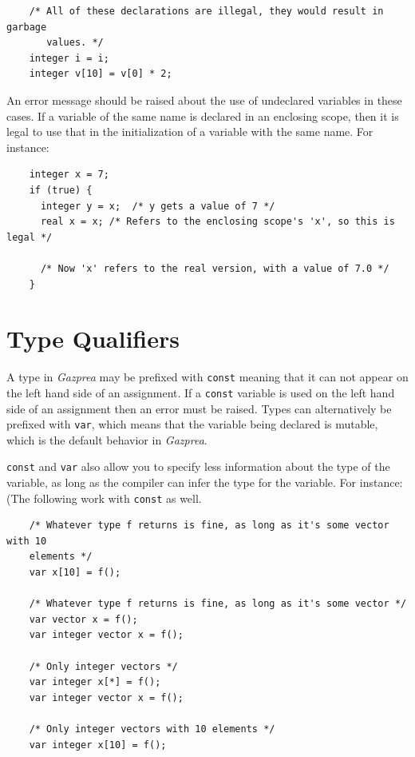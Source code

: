 \documentclass{article}
\begin{document}
  \begin{lstlisting}
    /* All of these declarations are illegal, they would result in garbage
       values. */
    integer i = i;
    integer v[10] = v[0] * 2;
  \end{lstlisting}

  An error message should be raised about the use of undeclared variables in these cases. If a variable of the same
  name is declared in an enclosing scope, then it is legal to use that in the initialization of a variable with the
  same name. For instance:

  \begin{lstlisting}
    integer x = 7;
    if (true) {
      integer y = x;  /* y gets a value of 7 */
      real x = x; /* Refers to the enclosing scope's 'x', so this is legal */

      /* Now 'x' refers to the real version, with a value of 7.0 */
    }
  \end{lstlisting}


\section{Type Qualifiers}\label{sec:typeQualifiers}
  A type in \textit{Gazprea} may be prefixed with \texttt{const} meaning that it can not appear on the left hand side
  of an assignment. If a \texttt{const} variable is used on the left hand side of an assignment then an error must be
  raised. Types can alternatively be prefixed with \texttt{var}, which means that the variable being declared is
  mutable, which is the default behavior in \textit{Gazprea}.

  \texttt{const} and \texttt{var} also allow you to specify less information about the type of the variable, as long
  as the compiler can infer the type for the variable. For instance: (The following work with \texttt{const} as well.

  \begin{lstlisting}
    /* Whatever type f returns is fine, as long as it's some vector with 10
    elements */
    var x[10] = f();

    /* Whatever type f returns is fine, as long as it's some vector */
    var vector x = f();
    var integer vector x = f();

    /* Only integer vectors */
    var integer x[*] = f();
    var integer vector x = f();

    /* Only integer vectors with 10 elements */
    var integer x[10] = f();
  \end{lstlisting}
\end{document}
